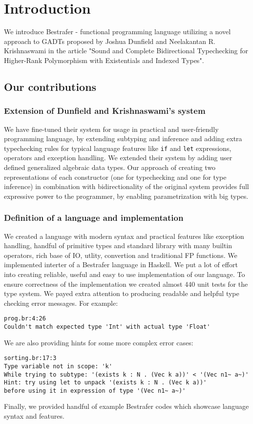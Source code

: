 \documentclass[declaration,shortabstract,english]{iithesis}
\author         {Konrad Werbliński}
\begin{document}

\chapter{Introduction}
We introduce Bestrafer - functional programming language utilizing a novel approach to GADTs proposed
by Joshua Dunfield and Neelakantan R. Krishnaswami in the article "Sound and Complete
Bidirectional Typechecking for Higher-Rank Polymorphism with Existentials and Indexed Types"\cite{gadt-popl19}.
\section{Our contributions}
\subsection*{Extension of Dunfield and Krishnaswami's system}
We have fine-tuned their system for usage in practical and user-friendly programming language, by
extending subtyping and inference and adding extra typechecking rules for typical language features like \verb+if+
and \verb+let+ expressions, operators and exception handling. We extended their system by adding user defined
generalized algebraic data types. Our approach of creating two representations of each constructor
(one for typechecking and one for type inference) in combination with bidirectionality of the original
system provides full expressive power to the programmer, by enabling parametrization with big types.
\subsection*{Definition of a language and implementation}
We created a language with modern syntax and practical features like exception handling, handful of primitive types
and standard library with many builtin operators, rich base of IO, utlity, convertion and traditional FP functions.
We implemented interter of a Bestrafer language in Haskell. We put a lot of effort into
creating reliable, useful and easy to use implementation of our language.
To ensure correctness of the implementation we created almost 440 unit tests for the type system.
We payed extra attention to producing readable and helpful type checking error messages.
For example:
\begin{verbatim}
prog.br:4:26
Couldn't match expected type 'Int' with actual type 'Float'
\end{verbatim}
We are also providing hints for some more complex error cases:
\begin{verbatim}
sorting.br:17:3
Type variable not in scope: 'k'
While trying to subtype: '(exists k : N . (Vec k a))' < '(Vec n1~ a~)'
Hint: try using let to unpack '(exists k : N . (Vec k a))'
before using it in expression of type '(Vec n1~ a~)'
\end{verbatim}
Finally, we provided handful of example Bestrafer codes which showcase language syntax and features.
\end{document}
